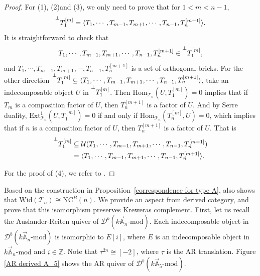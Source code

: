 \documentclass[a4paper, 11pt, reqno]{amsart}
\numberwithin{equation}{section}
\theoremstyle{remark}
\theoremstyle{definition}
\begin{document}
\begin{proof}
   For (1), (2)and (3), we only need to prove that for $1<m<n-1$,
   \[
      \prescript{\perp}{}{T_1^{[m]}}=\langle T_1, \cdots, T_{m-1},T_{m+1}, \cdots, T_{n-1}, T_n^{[m+1]} \rangle.
   \]
   It is straightforward to check that 
   \[
      T_1, \cdots, T_{m-1},T_{m+1}, \cdots, T_{n-1}, T_n^{[m+1]} \in \prescript{\perp}{}{T_1^{[m]}},
   \]
   and $T_1, \cdots, T_{m-1},T_{m+1}, \cdots, T_{n-1}, T_n^{[m+1]}$ is a set of orthogonal bricks. For the other direction $\prescript{\perp}{}{T_1^{[m]}} \subseteq \langle T_1, \cdots, T_{m-1},T_{m+1}, \cdots, T_{n-1}, T_n^{[m+1]} \rangle$, %
   take an indecomposable object $U$ in $\prescript{\perp}{}{T_1^{[m]}}$. Then $\mathrm{Hom}_{\mathcal T_n}(U,T_1^{[m]})=0$ implies that if $T_m$ is a composition factor of $U$, then $T_n^{[m+1]}$ is a factor of $U$. And by Serre duality, $\mathrm{Ext}_{\mathcal T_n}^1 (U,T_1^{[m]})=0$ if and only if $\mathrm{Hom}_{\mathcal T_n} (T_n^{[m]},U)=0$, which implies that if $n$ is a composition factor of $U$, then $T_n^{[m+1]}$ is a factor of $U$. That is 
   \begin{align*}
      \prescript{\perp}{}{T_1^{[m]}} &\subseteq \mathcal U(T_1, \cdots, T_{m-1},T_{m+1}, \cdots, T_{n-1}, T_n^{[m+1]}) \\
      &=\langle T_1, \cdots, T_{m-1},T_{m+1}, \cdots, T_{n-1}, T_n^{[m+1]}\rangle.
   \end{align*}

   For the proof of (4), we refer to \cite[Lemma 4.5(1)]{cheng2024wide}.
\end{proof}

Based on the construction in Proposition~\ref{correspondence for type A}, \cite[Lemma 8.2, Corollary 9.2(2)]{krause2021category} also shows that $\mathrm{Wid}(\mathcal T_n) \cong \mathrm{NC}^B(n)$. We provide an aspect from derived category, and prove that this isomorphism preserves Kreweras complement. First, let us recall the Auslander-Reiten quiver of $\mathcal{D}^b(k \vec{\mathbb A}_n \text{-mod})$. Each indecomposable object in $\mathcal{D}^b(k \vec{\mathbb A}_n \text{-mod})$ is isomorphic to $E[i]$, where $E$ is an indecomposable object in $k \vec{\mathbb A}_n \text{-mod}$ and $i \in \mathbb Z$. Note that $\tau ^{2n} \cong [-2]$, where $\tau$ is the AR translation. Figure \ref{AR derived A_5} shows the AR quiver of $\mathcal{D}^b(k \vec{\mathbb A}_5 \text{-mod})$.
\end{document}
